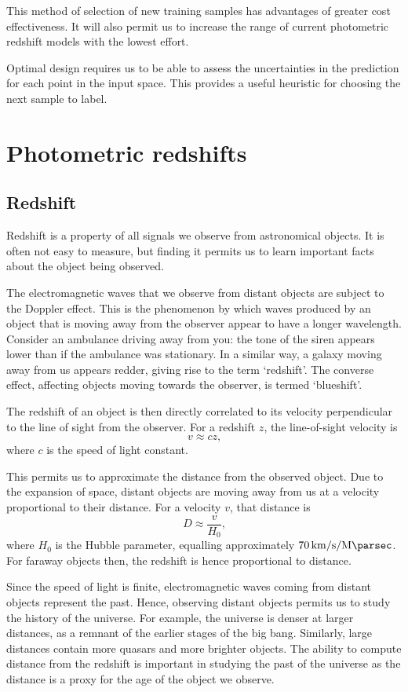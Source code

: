 \documentclass[11pt]{report}
\begin{document}
This method of selection of new training samples has advantages of greater cost effectiveness. It will also permit us to increase the range of current photometric redshift models with the lowest effort.

Optimal design requires us to be able to assess the uncertainties in the prediction for each point in the input space. This provides a useful heuristic for choosing the next sample to label.


\chapter{Photometric redshifts}

\section{Redshift}
Redshift is a property of all signals we observe from astronomical objects. It is often not easy to measure, but finding it permits us to learn important facts about the object being observed.

The electromagnetic waves that we observe from distant objects are subject to the Doppler effect. This is the phenomenon by which waves produced by an object that is moving away from the observer appear to have a longer wavelength. Consider an ambulance driving away from you: the tone of the siren appears lower than if the ambulance was stationary. In a similar way, a galaxy moving away from us appears redder, giving rise to the term `redshift'. The converse effect, affecting objects moving towards the observer, is termed `blueshift'.

The redshift of an object is then directly correlated to its velocity perpendicular to the line of sight from the observer. For a redshift $z$, the line-of-sight velocity is\[
    v \approx cz \text{,}
\] where $c$ is the speed of light constant.

This permits us to approximate the distance from the observed object. Due to the expansion of space, distant objects are moving away from us at a velocity proportional to their distance. For a velocity $v$, that distance is \[
    D \approx \frac{v}{H_0} \text{,}
\] where $H_0$ is the Hubble parameter, equalling approximately $\SI{70}{\kilo\meter\per\second\per\mega\parsec}$. For faraway objects then, the redshift is hence proportional to distance.

Since the speed of light is finite, electromagnetic waves coming from distant objects represent the past. Hence, observing distant objects permits us to study the history of the universe. For example, the universe is denser at larger distances, as a remnant of the earlier stages of the big bang. Similarly, large distances contain more quasars and more brighter objects. The ability to compute distance from the redshift is important in studying the past of the universe as the distance is a proxy for the age of the object we observe.
\end{document}
